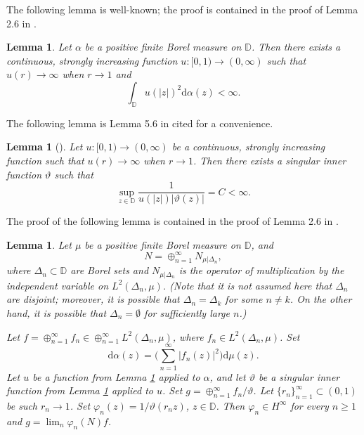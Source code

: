 \documentclass[a4paper,oneside,11pt]{amsart}
\numberwithin{equation}{section}
\theoremstyle{plain}
\newtheorem{lemma}[theorem]{Lemma}
\theoremstyle{definition}
\begin{document}
The following lemma is well-known;  the proof is contained in the proof of Lemma 2.6 in \cite{gamaljot}.

\begin{lemma}\label{lemalpha} Let $\alpha$ be a positive finite Borel measure on $\mathbb D$. 
Then there exists a  continuous, strongly increasing function  
 $u\colon[0,1)\to (0,\infty)$ such that  $u(r)\to\infty$ when $r\to 1$ and 
\begin{equation*} \int_{\mathbb D}u(|z|)^2\mathrm{d}\alpha(z)<\infty.\end{equation*}
\end{lemma}

The following lemma is Lemma 5.6 in \cite{est} cited for a convenience.

\begin{lemma}[\cite{est}]\label{lemest} Let $u\colon[0,1)\to (0,\infty)$ be a continuous, strongly increasing function such that 
 $u(r)\to\infty$ when $r\to 1$. 
Then there exists a singular inner function $\vartheta$ such that 
\begin{equation*} \sup_{z\in\mathbb D}\frac{1}{u(|z|)|\vartheta(z)|}=C<\infty.\end{equation*}
\end{lemma}

The proof of the following lemma  is contained in the proof of Lemma 2.6 in \cite{gamaljot}.

\begin{lemma}\label{lemsubspace}
Let  $\mu$ be  a positive finite  Borel  measure on $\mathbb D$, 
and 
\begin{equation*}N = \oplus_{n=1}^\infty N_{\mu|\Delta_n},
\end{equation*}
where $\Delta_n\subset\mathbb D$ are Borel sets and $N_{\mu|\Delta_n}$ is the operator 
of multiplication by the independent variable  
on $L^2(\Delta_n,\mu)$. 
(Note that it is not assumed here that $\Delta_n$ are disjoint; moreover, it is possible that 
$\Delta_n=\Delta_k$ for some $n\neq k$. On the other hand, it is possible that $\Delta_n=\emptyset$ for sufficiently large $n$.)

Let $f=\oplus_{n=1}^\infty f_n\in\oplus_{n=1}^\infty L^2(\Delta_n,\mu)$, where $f_n\in L^2(\Delta_n,\mu)$. 
Set 
\begin{equation*}
\mathrm{d}\alpha(z)=\Big(\sum_{n=1}^\infty|f_n(z)|^2\Big)\mathrm{d}\mu(z).
\end{equation*}
Let $u$ be a function from Lemma \ref{lemalpha} applied to $\alpha$, and let  $\vartheta$ be a singular inner function 
from  Lemma \ref{lemest} applied to $u$. 
Set $g= \oplus_{n=1}^\infty f_n/\vartheta$. Let $\{r_n\}_{n=1}^\infty\subset(0,1)$ be such
$r_n\to 1$. Set $\varphi_n(z)=1/\vartheta(r_nz)$,  $z\in\mathbb D$.  Then  $\varphi_n\in H^\infty$ 
for every $n\geq 1$
and $g=\lim_n\varphi_n(N)f$. 
\end{lemma} 
\end{document}
